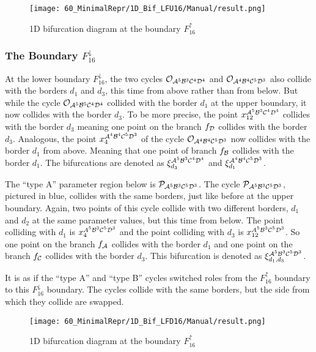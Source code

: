 \begin{figure}
    \centering
    \texttt{[image: 60\_MinimalRepr/1D\_Bif\_LFU16/Manual/result.png]}
    \label{fig:final.bifurcation.F.up}
    \caption{1D bifurcation diagram at the boundary $F_{16}^\uparrow$}
\end{figure}

\subsubsection{The Boundary $F_{16}^\downarrow$}

At the lower boundary $F_{16}^\downarrow$, the two cycles $\mathcal{O}_{\mathcal{A}^5\mathcal{B}^3\mathcal{C}^4\mathcal{D}^4}$ and $\mathcal{O}_{\mathcal{A}^4\mathcal{B}^4\mathcal{C}^5\mathcal{D}^3}$ also collide with the borders $d_1$ and $d_3$, this time from above rather than from below.
But while the cycle $\mathcal{O}_{\mathcal{A}^5\mathcal{B}^5\mathcal{C}^4\mathcal{D}^4}$ collided with the border $d_1$ at the upper boundary, it now collides with the border $d_3$.
To be more precise, the point $x_{12}^{\mathcal{A}^5\mathcal{B}^3\mathcal{C}^4\mathcal{D}^4}$ collides with the border $d_3$ meaning one point on the branch $f_{\mathcal{D}}$ collides with the border $d_3$.
Analogous, the point $x_{4}^{\mathcal{A}^4\mathcal{B}^4\mathcal{C}^5\mathcal{D}^3}$ of the cycle $\mathcal{O}_{\mathcal{A}^4\mathcal{B}^4\mathcal{C}^5\mathcal{D}^3}$ now collides with the border $d_1$ from above.
Meaning that one point of branch $f_{\mathcal{B}}$ collides with the border $d_1$. The bifurcations are denoted as $\xi_{d_3}^{\mathcal{A}^5\mathcal{B}^3\mathcal{C}^4\mathcal{D}^4}$ and $\xi_{d_1}^{\mathcal{A}^4\mathcal{B}^4\mathcal{C}^5\mathcal{D}^3}$.

The ``type A'' parameter region below is $\mathcal{P}_{\mathcal{A}^5\mathcal{B}^3\mathcal{C}^5\mathcal{D}^3}$.
The cycle $\mathcal{P}_{\mathcal{A}^5\mathcal{B}^3\mathcal{C}^5\mathcal{D}^3}$, pictured in blue, collides with the same borders, just like before at the upper boundary.
Again, two points of this cycle collide with two different borders, $d_1$ and $d_2$ at the same parameter values, but this time from below.
The point colliding with $d_1$ is $x_{4}^{A^5\mathcal{B}^3\mathcal{C}^5\mathcal{D}^3}$ and  the point colliding with $d_3$ is $x_{12}^{A^5\mathcal{B}^3\mathcal{C}^5\mathcal{D}^3}$.
So one point on the branch $f_{\mathcal{A}}$ collides with the border $d_1$ and one point on the branch $f_{\mathcal{C}}$ collides with the border $d_3$.
This bifurcation is denoted as $\xi_{d_1, d_3}^{\mathcal{A}^5\mathcal{B}^3\mathcal{C}^5\mathcal{D}^3}$.

It is as if the ``type A'' and ``type B'' cycles switched roles from the $F_{16}^\uparrow$ boundary to this $F_{16}^\downarrow$ boundary.
The cycles collide with the same borders, but the side from which they collide are swapped.

\begin{figure}
    \centering
    \texttt{[image: 60\_MinimalRepr/1D\_Bif\_LFD16/Manual/result.png]}
    \label{fig:final.bifurcation.F.down}
    \caption{1D bifurcation diagram at the boundary $F_{16}^\uparrow$}
\end{figure}

